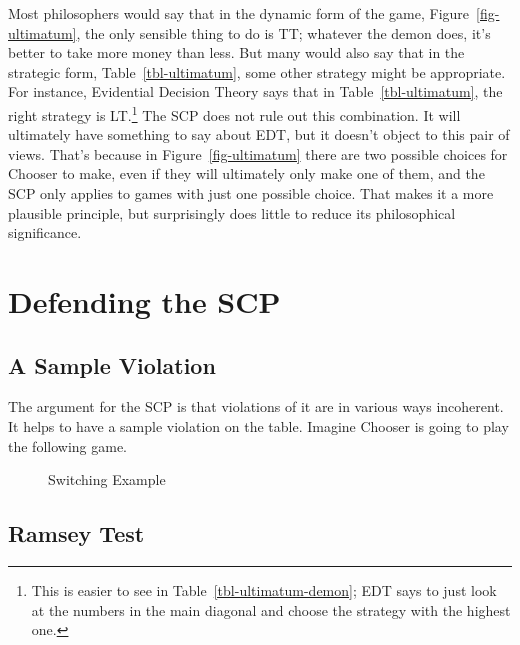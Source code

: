 \documentclass[
  10pt,
  letterpaper,
  DIV=11,
  numbers=noendperiod,
  twoside]{scrartcl}
\begin{document}
Most philosophers would say that in the dynamic form of the game,
Figure~\ref{fig-ultimatum}, the only sensible thing to do is TT;
whatever the demon does, it's better to take more money than less. But
many would also say that in the strategic form,
Table~\ref{tbl-ultimatum}, some other strategy might be appropriate. For
instance, Evidential Decision Theory says that in
Table~\ref{tbl-ultimatum}, the right strategy is LT.\footnote{This is
  easier to see in Table~\ref{tbl-ultimatum-demon}; EDT says to just
  look at the numbers in the main diagonal and choose the strategy with
  the highest one.} The SCP does not rule out this combination. It will
ultimately have something to say about EDT, but it doesn't object to
this pair of views. That's because in Figure~\ref{fig-ultimatum} there
are two possible choices for Chooser to make, even if they will
ultimately only make one of them, and the SCP only applies to games with
just one possible choice. That makes it a more plausible principle, but
surprisingly does little to reduce its philosophical significance.

\section{Defending the SCP}\label{sec-scp-defence}

\subsection{A Sample Violation}\label{a-sample-violation}

The argument for the SCP is that violations of it are in various ways
incoherent. It helps to have a sample violation on the table. Imagine
Chooser is going to play the following game.

\begin{figure}


\caption{\label{fig-sample-violation}Switching Example}

\end{figure}%

\subsection{Ramsey Test}\label{ramsey-test}
\end{document}
